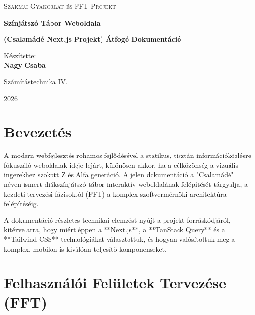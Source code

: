 \documentclass[12pt, a4paper]{report}
\begin{document}
\begin{titlepage}
    \centering
    \vspace*{3cm}
    
    {\scshape\Large Szakmai Gyakorlat és FFT Projekt\par}
    \vspace{1.5cm}
    
    {\huge\bfseries Színjátszó Tábor Weboldala\par}
    {\Large\bfseries (Csalamádé Next.js Projekt) Átfogó Dokumentáció\par}
    \vspace{2cm}
    
    {\Large Készítette:\\ \textbf{Nagy Csaba}}\par
    \vspace{0.5cm}
    {\large Számítástechnika IV.\par}
    
    \vfill
    
    {\large 2026\par}
\end{titlepage}

\tableofcontents
\newpage

\chapter{Bevezetés}

A modern webfejlesztés rohamos fejlődésével a statikus, tisztán információközlésre fókuszáló weboldalak ideje lejárt, különösen akkor, ha a célközönség a vizuális ingerekhez szokott Z és Alfa generáció. A jelen dokumentáció a "Csalamádé" néven ismert diákszínjátszó tábor interaktív weboldalának felépítését tárgyalja, a kezdeti tervezési fázisoktól (FFT) a komplex szoftvermérnöki architektúra felépítéséig.

A dokumentáció részletes technikai elemzést nyújt a projekt forráskódjáról, kitérve arra, hogy miért éppen a **Next.js**, a **TanStack Query** és a **Tailwind CSS** technológiákat választottuk, és hogyan valósítottuk meg a komplex, mobilon is kiválóan teljesítő komponenseket.

\chapter{Felhasználói Felületek Tervezése (FFT)}
\end{document}
